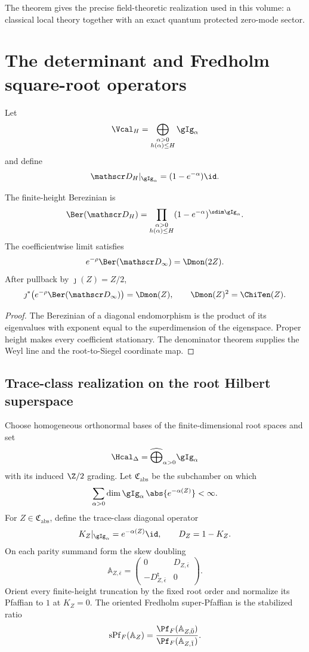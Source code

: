 The theorem gives the precise field-theoretic realization used in this volume: a classical local theory together with an exact quantum protected zero-mode sector.

\chapter{The determinant and Fredholm square-root operators}
Let
\[
 \Vcal_H=\bigoplus_{\substack{\alpha>0\\h(\alpha)\le H}}\gIg_\alpha
\]
and define
\[
 \mathscr D_H|_{\gIg_\alpha}=(1-e^{-\alpha})\id.
\]

\begin{theorem}
The finite-height Berezinian is
\[
 \Ber(\mathscr D_H)
 =\prod_{\substack{\alpha>0\\h(\alpha)\le H}}
 (1-e^{-\alpha})^{\sdim\gIg_\alpha}.
\]
The coefficientwise limit satisfies
\[
 e^{-\rho}\Ber(\mathscr D_\infty)=\Dmon(2Z).
\]
After pullback by $\jmath(Z)=Z/2$,
\[
 \jmath^*\!\left(e^{-\rho}\Ber(\mathscr D_\infty)\right)=\Dmon(Z),
 \qquad \Dmon(Z)^2=\ChiTen(Z).
\]
\end{theorem}
\begin{proof}
The Berezinian of a diagonal endomorphism is the product of its eigenvalues with exponent equal to the superdimension of the eigenspace.  Proper height makes every coefficient stationary.  The denominator theorem supplies the Weyl line and the root-to-Siegel coordinate map.
\end{proof}

\section{Trace-class realization on the root Hilbert superspace}
Choose homogeneous orthonormal bases of the finite-dimensional root spaces and set
\[
 \Hcal_{\Delta}=\widehat\bigoplus_{\alpha>0}\gIg_\alpha
\]
with its induced $\Z/2$ grading.  Let $\mathfrak C_{\mathrm{abs}}$ be the subchamber on which
\[
 \sum_{\alpha>0}\dim\gIg_\alpha\,
       \abs{e^{-\alpha(Z)}}<\infty.
\]
For $Z\in\mathfrak C_{\mathrm{abs}}$, define the trace-class diagonal operator
\[
 K_Z|_{\gIg_\alpha}=e^{-\alpha(Z)}\id,
 \qquad D_Z=1-K_Z.
\]
On each parity summand form the skew doubling
\[
 \mathbb A_{Z,\bar\epsilon}=
 \begin{pmatrix}0&D_{Z,\bar\epsilon}\\-D_{Z,\bar\epsilon}^{\mathsf t}&0\end{pmatrix}.
\]
Orient every finite-height truncation by the fixed root order and normalize its Pfaffian to $1$ at $K_Z=0$.  The oriented Fredholm super-Pfaffian is the stabilized ratio
\[
 \operatorname{sPf}_{F}(\mathbb A_Z)
 =\frac{\Pf_F(\mathbb A_{Z,\bar0})}
        {\Pf_F(\mathbb A_{Z,\bar1})}.
\]

